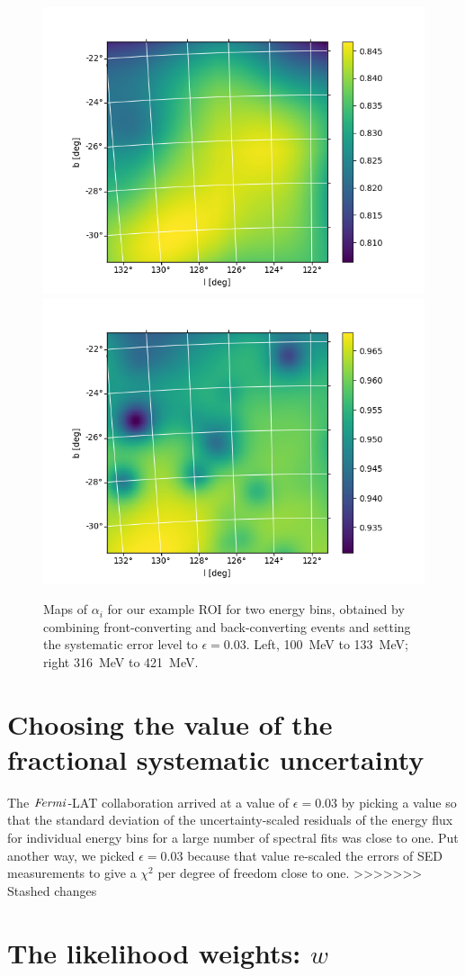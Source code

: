 \documentclass[preprint]{aastex}
\begin{document}
\begin{figure}[h]  
\begin{centering}
\includegraphics[width=0.49\columnwidth]{figures/alpha_E00_00.png}
\includegraphics[width=0.49\columnwidth]{figures/alpha_E01_04.png}
\vspace{-0.10in}
\caption{\label{fig:alpha}Maps of $\alpha_{i}$ for our example ROI
  for two energy bins, obtained by combining front-converting and 
  back-converting events and setting the systematic error level
  to $\epsilon = 0.03$.  Left, 100~MeV to 133~MeV; right 316~MeV to 421~MeV.}
\end{centering}
\end{figure}


\section{Choosing the value of the fractional systematic uncertainty}

The {$\it Fermi$}-LAT collaboration arrived at a value of $\epsilon = 0.03$ by 
picking a value so that the standard deviation of the uncertainty-scaled residuals 
of the energy flux for individual energy bins for a large number of spectral fits 
was close to one.  Put another way, we picked $\epsilon = 0.03$ because that value
re-scaled the errors of SED measurements to give a $\chi^2$ per degree of freedom 
close to one.
>>>>>>> Stashed changes


\section{The likelihood weights: \texorpdfstring{$w$}{w}}
\end{document}
